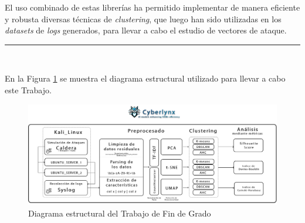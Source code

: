 El uso combinado de estas librerías ha permitido implementar de manera eficiente y robusta diversas técnicas de \textit{clustering}, que luego han sido utilizadas en los \textit{datasets} de \textit{logs} generados, para llevar a cabo el estudio de vectores de ataque.

\vspace{4mm}
\noindent\rule[-1ex]{\textwidth}{0.5pt}\\
\vspace{4mm}

En la Figura \ref{fig:diagrama-estructural} se muestra el diagrama estructural utilizado para llevar a cabo este Trabajo.

\newpage

\begin{landscape}   
    \noindent\hspace*{-2.7cm}
    \begin{minipage}{\linewidth}
        \begin{figure}[H]
            \centering
            \includegraphics[width=1.3\linewidth, keepaspectratio]{imagenes/scheme-v4.png}
            \caption{Diagrama estructural del Trabajo de Fin de Grado}
            \label{fig:diagrama-estructural}
        \end{figure}
    \end{minipage}
\end{landscape}

\newpage
